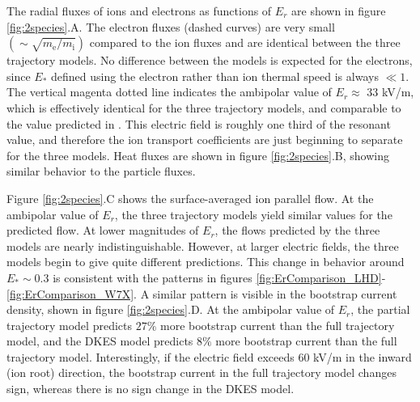 \documentclass[12pt]{revtex4}
\newcommand{\me}{m_{\mathrm{e}}}
\newcommand{\mi}{m_{\mathrm{i}}}
\begin{document}
The radial fluxes of ions and electrons as functions of $E_r$ are shown in figure \ref{fig:2species}.A.
The electron fluxes (dashed curves) are very small $(\sim \sqrt{\me/\mi})$ compared to the ion fluxes
and are identical between the three trajectory models. No difference between the models is expected for
the electrons, since $E_*$ defined using the electron rather than ion thermal speed is always $\ll 1$.
The vertical magenta dotted line indicates the ambipolar value of $E_r \approx $ 33 kV/m, which is effectively
identical for the three trajectory models, and comparable to the value predicted in \cite{Turkin}.
This electric field is roughly one third of the resonant value, and therefore the ion transport coefficients are
just beginning to separate for the three models. Heat fluxes are shown in figure \ref{fig:2species}.B, showing similar
behavior to the particle fluxes.

Figure \ref{fig:2species}.C shows the surface-averaged ion parallel flow. At the ambipolar value of $E_r$,
the three trajectory models yield similar values for the predicted flow.
At lower magnitudes of $E_r$, the flows predicted by the three models are nearly indistinguishable.
However, at larger electric fields, the three models begin to give quite different predictions.
This change in behavior around $E_* \sim 0.3$ is consistent with the patterns in figures \ref{fig:ErComparison_LHD}- \ref{fig:ErComparison_W7X}.
A similar pattern is visible in the bootstrap current density, shown in figure \ref{fig:2species}.D.
At the ambipolar value of $E_r$, the partial trajectory model predicts
$27\%$ more bootstrap current than the full trajectory model,
and the DKES model predicts $8\%$ more bootstrap current than the full trajectory model.
Interestingly, if the electric field exceeds 60 kV/m in the inward (ion root) direction, the bootstrap current
in the full trajectory model changes sign, whereas there is no sign change in the DKES model.
\end{document}
